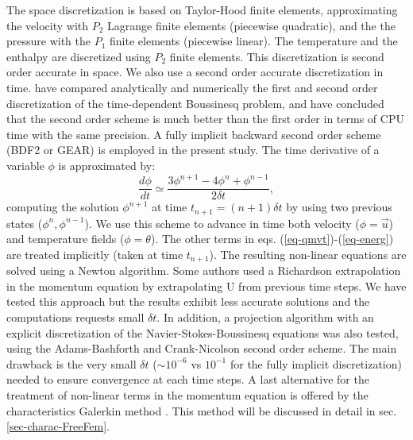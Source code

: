 The space discretization is based on Taylor-Hood finite elements, approximating  the velocity with $P_{2}$ Lagrange finite elements (piecewise quadratic), and the
the pressure with the $P_{1}$ finite elements (piecewise linear). The temperature and the enthalpy are discretized using $P_2$ finite elements.  
This discretization is second order accurate in space.
We also use a second order accurate discretization in time.
\cite{aldbaissy2018full} have compared analytically and numerically the first and second order discretization of the time-dependent Boussinesq problem, and have concluded that the second order scheme is much better than the first order in terms of CPU time with the same precision.
A fully implicit backward second order scheme (BDF2 or GEAR) is employed in the present study. The time derivative of a variable $\phi$ is approximated  by:
\begin{equation}	
\label{eq-Gear}
	\frac{d\phi}{dt} \simeq \frac{3\phi^{n+1} - 4\phi^{n}+ \phi^{n-1}}{2\delta t},
\end{equation}
computing the solution $\phi^{n+1}$ at time  $t_{n+1}=(n+1) \delta t$ by using two previous states ($\phi^{n}, \phi^{n-1}$). We use this scheme to advance in time both velocity ($\phi=\vec{u}$) and temperature fields  ($\phi=\theta$).  The other terms in eqs. (\ref{eq-qmvt})-(\ref{eq-energ}) are treated implicitly (\ie taken at time $t_{n+1}$). The resulting non-linear equations are solved using a Newton algorithm. 
Some authors used a Richardson extrapolation \citep{Belhamadia2012,wang2010numerical} in the momentum equation by extrapolating U from previous time steps.
We have tested this approach but the results exhibit less accurate solutions and the computations requests small $\delta t$.
In addition, a projection algorithm with an explicit discretization of the Navier-Stokes-Boussinesq equations was also tested, using the Adams-Bashforth and Crank-Nicolson second order scheme.
The main drawback is the very small $\delta t$ ($\sim 10^{-6}$ vs $10^{-1}$ for the fully implicit discretization) needed to ensure convergence at each time steps.
A last alternative for the treatment of non-linear terms in the momentum equation is offered by the characteristics Galerkin method \cite{Pironneau92}.
This method will be discussed in detail in sec. \ref{sec-charac-FreeFem}.

